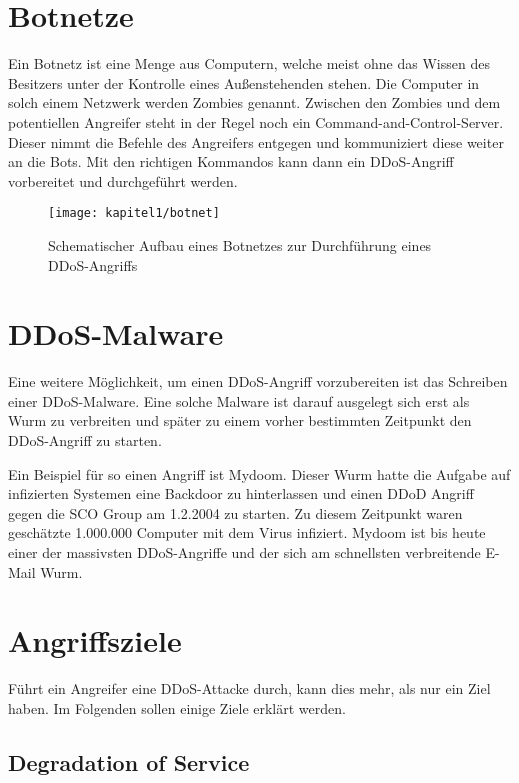 \section{Botnetze}

Ein Botnetz ist eine Menge aus Computern, welche meist ohne das Wissen des Besitzers unter der Kontrolle eines Außenstehenden stehen. Die Computer in solch einem Netzwerk werden Zombies genannt. Zwischen den Zombies und dem potentiellen Angreifer steht in der Regel noch ein Command-and-Control-Server. Dieser nimmt die Befehle des Angreifers entgegen und kommuniziert diese weiter an die Bots. Mit den richtigen Kommandos kann dann ein DDoS-Angriff vorbereitet und durchgeführt werden.

\begin{figure}[h]
		\centering
		\texttt{[image: kapitel1/botnet]}
		\caption[Schematischer Aufbau bei einem DDoS-Angriff mit einem Botnetz]{Schematischer Aufbau eines Botnetzes zur Durchführung eines DDoS-Angriffs}
		\label{img:botnet}
\end{figure}

\section{DDoS-Malware}

Eine weitere Möglichkeit, um einen DDoS-Angriff vorzubereiten ist das Schreiben einer DDoS-Malware. Eine solche Malware ist darauf ausgelegt sich erst als Wurm zu verbreiten und später zu einem vorher bestimmten Zeitpunkt den DDoS-Angriff zu starten.

Ein Beispiel für so einen Angriff ist Mydoom. Dieser Wurm hatte die Aufgabe auf infizierten Systemen eine Backdoor zu hinterlassen und einen DDoD Angriff gegen die SCO Group am 1.2.2004 zu starten. Zu diesem Zeitpunkt waren geschätzte 1.000.000 Computer mit dem Virus infiziert. Mydoom ist bis heute einer der massivsten DDoS-Angriffe und der sich am schnellsten verbreitende E-Mail Wurm.

\section{Angriffsziele}
\label{chap:kapitel4}

Führt ein Angreifer eine DDoS-Attacke durch, kann dies mehr, als nur ein Ziel haben. Im Folgenden sollen einige Ziele erklärt werden.

\subsection{Degradation of Service}

